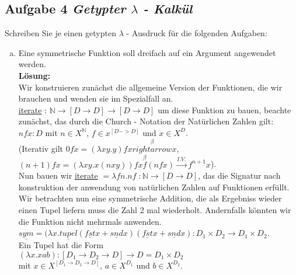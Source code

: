 \documentclass[11pt,a4paper,ngerman]{article}
\begin{document}
\subsection*{Aufgabe 4 \mdseries\itshape Getypter $\lambda$ - Kalkül}
Schreiben Sie je einen getypten $\lambda$ - Ausdruck für die folgenden Aufgaben:
\begin{enumerate}[(a)]
	\item Eine symmetrische Funktion soll dreifach auf ein Argument angewendet werden.\\
   \textbf{Lösung:}\\
      Wir konstruieren zunächst die allgemeine Version der Funktionen, die wir brauchen
      und wenden sie im Spezialfall an.\\
      \underline{iterate} : $\mathbb{N} \rightarrow [D \rightarrow D] \rightarrow [D \rightarrow D]$ um diese
      Funktion zu bauen, beachte zunächst, das durch die Church - Notation der
      Natürlichen Zahlen gilt: $n f x: D$ mit $n \in X^{\mathbb{N}}$, $f \in x^{[D->D]}$ und
      $x \in X^D$.\\
      (Iterativ gilt $0 f x = (\lambda xy.y) f x \overset{\beta}{rightarrow} x$,\\
      $(n+1) f x = (\lambda xy.x(n x y)) f x \overset{\beta} f (n f x) \overset{I.V.}{\rightarrow}
         f^{n+1} x$).\\
      Nun bauen wir 
      \underline{iterate} $= \lambda f n. n f \; : \mathbb{N} \rightarrow [D \rightarrow D]$,
      das die Signatur nach konstruktion der anwendung von natürlichen Zahlen auf Funktionen erfüllt.\\

      Wir betrachten nun eine symmetrische Addition, die als Ergebniss wieder einen Tupel liefern muss
      die Zahl 2 mal wiederholt. Andernfalls könnten wir die Funktion nicht mehrmals anwenden.\\

      $\underline{sym} = (\lambda x. \underline{tupel} (\underline{fst} x + \underline{snd} x) 
         (\underline{fst}x + \underline{snd}x) : D_1 \times D_2 \rightarrow D_1 \times D_2$.\\

      Ein Tupel hat die Form \\
      $(\lambda x. x a b) : [D_1 \rightarrow D_2 \rightarrow D] \rightarrow D = D_1 \times D_2$\\
      mit $x \in X^{[D_1 \rightarrow D_2 \rightarrow D]}$, $a \in X^{D_1}$ und $b \in X^{D_2}$.\\


\end{enumerate}
\end{document}
